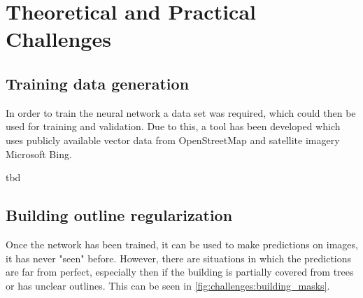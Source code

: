 
\chapter{Theoretical and Practical Challenges}

\section{Training data generation}
In order to train the neural network a data set was required, which could then be used for training and validation. Due to this, a tool \cite{airtiler} has been developed which uses publicly available vector data from OpenStreetMap and satellite imagery Microsoft Bing.

tbd

\section{Building outline regularization}
Once the network has been trained, it can be used to make predictions on images, it has never "seen" before. However, there are situations in which the predictions are far from perfect, especially then if the building is partially covered from trees or has unclear outlines. This can be seen in \autoref{fig:challenges:building_masks}.


